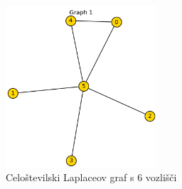 \documentclass{article}
\begin{document}
\begin{figure}[H]
    \centering
    \includegraphics[width=0.5\textwidth]{primer_6.png}
    \caption{Celoštevilski Laplaceov graf s 6 vozlišči}
    \label{fig:izjema2}
\end{figure}
\end{document}
